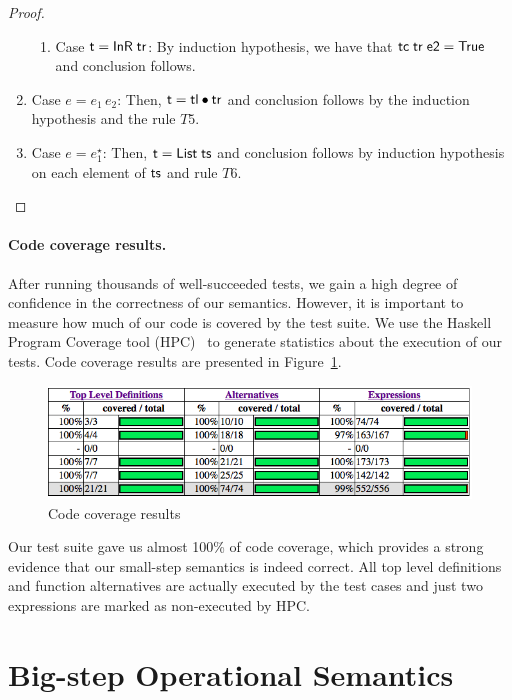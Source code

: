 \documentclass[oneside,12pt]{scrbook}
\theoremstyle{definition}
\newcommand{\C}[1]{\red{\mathsf{#1}}}
\newcommand{\F}[1]{\green{\mathsf{#1}}}
\newcommand{\V}[1]{\black{\mathsf{#1}}}
\theoremstyle{plain}
\theoremstyle{definition}
\begin{document}
\begin{proof}
\begin{enumerate}
\begin{enumerate}
			\item Case \ensuremath{\V{t}\mathrel{=}\C{InR}\;\V{tr}}: By induction hypothesis, we have that \ensuremath{\F{tc}\;\V{tr}\;\V{e2}\mathrel{=}\C{True}} and conclusion follows.
		\end{enumerate}
		\item Case $e = e_1\,e_2$: Then, \ensuremath{\V{t}\mathrel{=}\V{tl}\C{\:\bullet\:}\V{tr}} and conclusion follows by the induction
		hypothesis and the rule $T5$.
		\item Case $e = e_1^\star$: Then, \ensuremath{\V{t}\mathrel{=}\C{List}\;\V{ts}} and conclusion follows by induction hypothesis
		on each element of \ensuremath{\V{ts}} and rule $T6$.
	\end{enumerate}
\end{proof}

\paragraph{Code coverage results.}

After running thousands of well-succeeded tests, we gain a high degree of confidence in the correctness
of our semantics. However, it is important to measure how much of our code is covered by the test suite.
We use the Haskell Program Coverage tool (HPC)~\cite{Gill2007} to generate statistics about the execution of our tests.
Code coverage results are presented in Figure~\ref{figure:coverage}.

\begin{figure}[h!]
	\includegraphics[width=\linewidth]{coverage-results.png}
	\caption{Code coverage results}
	\label{figure:coverage}
\end{figure}

Our test suite gave us almost 100\% of code coverage, which provides a strong evidence that our small-step semantics
is indeed correct. All top level definitions and function alternatives are actually executed by the test cases
and just two expressions are marked as non-executed by HPC.


\section{Big-step Operational Semantics}\label{section:bigstepsemantics}
\end{document}
